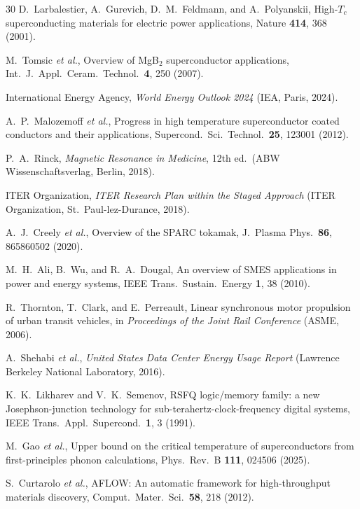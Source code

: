 \documentclass[prl,twocolumn,superscriptaddress,longbibliography,floatfix]{revtex4-2}
\begin{document}
\begin{thebibliography}{30}
D.~Larbalestier, A.~Gurevich, D.~M.~Feldmann, and A.~Polyanskii,
High-$T_c$ superconducting materials for electric power applications,
Nature \textbf{414}, 368 (2001).

M.~Tomsic \textit{et al.},
Overview of MgB$_2$ superconductor applications,
Int.\ J.\ Appl.\ Ceram.\ Technol.\ \textbf{4}, 250 (2007).

International Energy Agency,
\textit{World Energy Outlook 2024} (IEA, Paris, 2024).

A.~P.~Malozemoff \textit{et al.},
Progress in high temperature superconductor coated conductors
and their applications,
Supercond.\ Sci.\ Technol.\ \textbf{25}, 123001 (2012).

P.~A.~Rinck,
\textit{Magnetic Resonance in Medicine}, 12th ed.\
(ABW Wissenschaftsverlag, Berlin, 2018).

ITER Organization,
\textit{ITER Research Plan within the Staged Approach}
(ITER Organization, St.\ Paul-lez-Durance, 2018).

A.~J.~Creely \textit{et al.},
Overview of the SPARC tokamak,
J.\ Plasma Phys.\ \textbf{86}, 865860502 (2020).

M.~H.~Ali, B.~Wu, and R.~A.~Dougal,
An overview of SMES applications in power and energy systems,
IEEE Trans.\ Sustain.\ Energy \textbf{1}, 38 (2010).

R.~Thornton, T.~Clark, and E.~Perreault,
Linear synchronous motor propulsion of urban transit vehicles,
in \textit{Proceedings of the Joint Rail Conference} (ASME, 2006).

A.~Shehabi \textit{et al.},
\textit{United States Data Center Energy Usage Report}
(Lawrence Berkeley National Laboratory, 2016).

K.~K.~Likharev and V.~K.~Semenov,
RSFQ logic/memory family: a new Josephson-junction technology
for sub-terahertz-clock-frequency digital systems,
IEEE Trans.\ Appl.\ Supercond.\ \textbf{1}, 3 (1991).

M.~Gao \textit{et al.},
Upper bound on the critical temperature of superconductors from
first-principles phonon calculations,
Phys.\ Rev.\ B \textbf{111}, 024506 (2025).

S.~Curtarolo \textit{et al.},
AFLOW: An automatic framework for high-throughput materials discovery,
Comput.\ Mater.\ Sci.\ \textbf{58}, 218 (2012).


\end{thebibliography}
\end{document}
